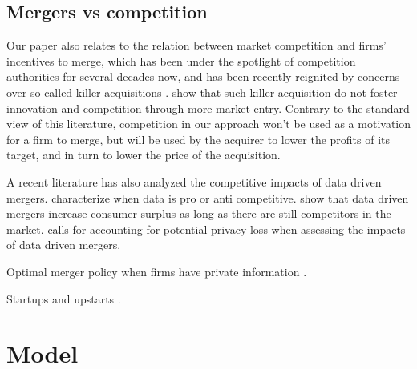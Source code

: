\documentclass[a4paper,leqno]{article}%
\begin{document}
\medskip

\subsection{Mergers vs competition}

Our paper also relates to the relation between market competition and firms' incentives to merge, which has been under the spotlight of competition authorities for several decades now, and has been recently reignited by concerns over so called killer acquisitions \citep{cunningham2019killer}. \cite{kamepalli2020kill} show that such killer acquisition do not foster innovation and competition through more market entry. Contrary to the standard view of this literature, competition in our approach won't be used as a motivation for a firm to merge, but will be used by the acquirer to lower the profits of its target, and in turn to lower the price of the acquisition.

A recent literature has also analyzed the competitive impacts of data driven mergers. \cite{de2020data} characterize when data is pro or anti competitive. \cite{chen2020data} show that data driven mergers increase consumer surplus as long as there are still competitors in the market. \cite{chirita2018data} calls for accounting for potential privacy loss when assessing the impacts of data driven mergers.



Optimal merger policy when firms have private information \cite{Besanko1993}.

Startups and upstarts \cite{awaya2021startups}.


\section{Model}
\end{document}
